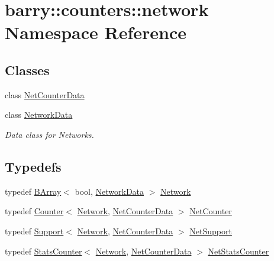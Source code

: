 \hypertarget{namespacebarry_1_1counters_1_1network}{}\section{barry\+:\+:counters\+:\+:network Namespace Reference}
\label{namespacebarry_1_1counters_1_1network}
\subsection*{Classes}
\begin{DoxyCompactItemize}
\item 
class \hyperlink{classbarry_1_1counters_1_1network_1_1_net_counter_data}{Net\+Counter\+Data}
\item 
class \hyperlink{classbarry_1_1counters_1_1network_1_1_network_data}{Network\+Data}
\begin{DoxyCompactList}\small\item\em Data class for Networks. \end{DoxyCompactList}\end{DoxyCompactItemize}
\subsection*{Typedefs}
\begin{DoxyCompactItemize}
\item 
typedef \hyperlink{classbarry_1_1_b_array}{B\+Array}$<$ bool, \hyperlink{classbarry_1_1counters_1_1network_1_1_network_data}{Network\+Data} $>$ \hyperlink{namespacebarry_1_1counters_1_1network_a4cb88d4572ded3b447ea269c9cd0b2c0}{Network}
\item 
typedef \hyperlink{classbarry_1_1_counter}{Counter}$<$ \hyperlink{namespacebarry_1_1counters_1_1network_a4cb88d4572ded3b447ea269c9cd0b2c0}{Network}, \hyperlink{classbarry_1_1counters_1_1network_1_1_net_counter_data}{Net\+Counter\+Data} $>$ \hyperlink{namespacebarry_1_1counters_1_1network_a067bd9de04608fc2e1586324d3864a45}{Net\+Counter}
\item 
typedef \hyperlink{classbarry_1_1_support}{Support}$<$ \hyperlink{namespacebarry_1_1counters_1_1network_a4cb88d4572ded3b447ea269c9cd0b2c0}{Network}, \hyperlink{classbarry_1_1counters_1_1network_1_1_net_counter_data}{Net\+Counter\+Data} $>$ \hyperlink{namespacebarry_1_1counters_1_1network_a4d30be7f465efd7d218f0264f8386b32}{Net\+Support}
\item 
typedef \hyperlink{classbarry_1_1_stats_counter}{Stats\+Counter}$<$ \hyperlink{namespacebarry_1_1counters_1_1network_a4cb88d4572ded3b447ea269c9cd0b2c0}{Network}, \hyperlink{classbarry_1_1counters_1_1network_1_1_net_counter_data}{Net\+Counter\+Data} $>$ \hyperlink{namespacebarry_1_1counters_1_1network_ae26c399917113fe280b3f2859376b8b9}{Net\+Stats\+Counter}
\end{DoxyCompactItemize}
